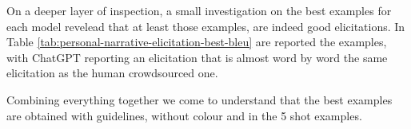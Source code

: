 
On a deeper layer of inspection, a small investigation on the best examples for each model revelead that at least those examples, are indeed good elicitations. In Table \ref{tab:personal-narrative-elicitation-best-bleu} are reported the examples, with ChatGPT reporting an elicitation that is almost word by word the same elicitation as the human crowdsourced one.

Combining everything together we come to understand that the best examples are obtained with guidelines, without colour and in the 5 shot examples. %